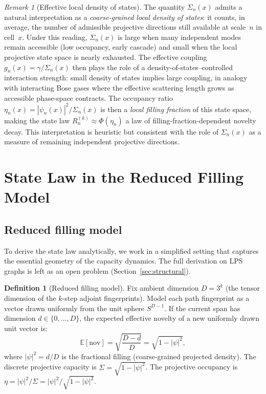 \documentclass[11pt,a4paper]{article}
\theoremstyle{definition}
\newtheorem{definition}[theorem]{Definition}
\theoremstyle{remark}
\newtheorem{remark}[theorem]{Remark}
\newcommand{\nov}{\mathrm{nov}}
\begin{document}
    \begin{remark}[Effective local density of states]
      \label{rem:dos}
      The quantity $\Sigma_n(x)$ admits a natural interpretation as a
      \emph{coarse-grained local density of states}: it counts, in average, the number of
      admissible projective directions still available at scale~$n$ in cell~$x$.
      Under this reading, $\Sigma_n(x)$ is large when many independent modes remain accessible
      (low occupancy, early cascade) and small when the local projective state space is nearly
      exhausted.
      The effective coupling $g_n(x) = \gamma/\Sigma_n(x)$ then plays the role of a
      density-of-states--controlled interaction strength: small density of states implies
      large coupling, in analogy with interacting Bose gases where the effective scattering
      length grows as accessible phase-space contracts.
      The occupancy ratio $\eta_n(x) = |\psi_n(x)|^2/\Sigma_n(x)$ is then a
      \emph{local filling fraction} of this state space, making the state law
      $R_n^{(k)} \approx \Phi(\eta_n)$ a law of filling-fraction-dependent novelty decay.
      This interpretation is heuristic but consistent with the role of $\Sigma_n(x)$
      as a measure of remaining independent projective directions.
    \end{remark}

  \section{State Law in the Reduced Filling Model}
  \label{sec:statelaw}

  \subsection{Reduced filling model}
    \label{ssec:reduced-model}

    To derive the state law analytically, we work in a simplified setting that captures the
    essential geometry of the capacity dynamics.
    The full derivation on LPS graphs is left as an open problem (Section~\ref{sec:structural}).

    \begin{definition}[Reduced filling model]
      \label{def:reduced}
      Fix ambient dimension $D = 3^k$ (the tensor dimension of the $k$-step adjoint fingerprints).
      Model each path fingerprint as a vector drawn uniformly from the unit sphere $S^{D-1}$.
      If the current span has dimension $d \in \{0,\ldots,D\}$, the expected effective novelty of
      a new uniformly drawn unit vector is:
      \begin{equation}
        \label{eq:novelty-model}
        \mathbb{E}[\nov] = \sqrt{\frac{D-d}{D}} = \sqrt{1 - |\psi|^2},
      \end{equation}
      where $|\psi|^2 = d/D$ is the fractional filling (coarse-grained projected density).
      The discrete projective capacity is $\Sigma = \sqrt{1-|\psi|^2}$.
      The projective occupancy is $\eta = |\psi|^2/\Sigma = |\psi|^2/\sqrt{1-|\psi|^2}$.
    \end{definition}
\end{document}
